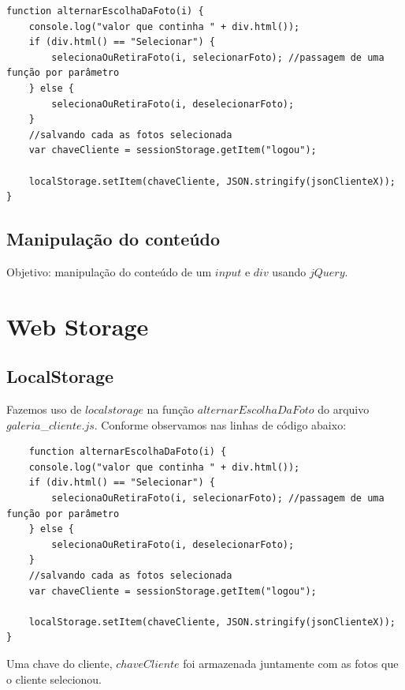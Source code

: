\begin{lstlisting}
function alternarEscolhaDaFoto(i) {
    console.log("valor que continha " + div.html());
    if (div.html() == "Selecionar") {
        selecionaOuRetiraFoto(i, selecionarFoto); //passagem de uma função por parâmetro
    } else {
        selecionaOuRetiraFoto(i, deselecionarFoto);
    }
    //salvando cada as fotos selecionada
    var chaveCliente = sessionStorage.getItem("logou");

    localStorage.setItem(chaveCliente, JSON.stringify(jsonClienteX));
}
\end{lstlisting}

\subsection{Manipulação do conteúdo}
	Objetivo: manipulação do conteúdo de um $input$ e $div$ usando $jQuery$.

\section{Web Storage }
\subsection{LocalStorage}
	Fazemos uso de $localstorage$ na função $alternarEscolhaDaFoto$ do arquivo $galeria$\_$cliente.js$. Conforme observamos nas linhas de código abaixo:
	
\begin{lstlisting}
	function alternarEscolhaDaFoto(i) {
    console.log("valor que continha " + div.html());
    if (div.html() == "Selecionar") {
        selecionaOuRetiraFoto(i, selecionarFoto); //passagem de uma função por parâmetro
    } else {
        selecionaOuRetiraFoto(i, deselecionarFoto);
    }
    //salvando cada as fotos selecionada
    var chaveCliente = sessionStorage.getItem("logou");

    localStorage.setItem(chaveCliente, JSON.stringify(jsonClienteX));
}
	\end{lstlisting}
	Uma chave do cliente, $chaveCliente$ foi armazenada juntamente com as fotos que o cliente selecionou.
	
